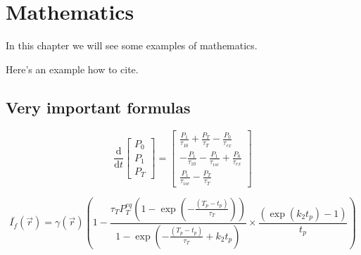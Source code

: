 
\chapter{Mathematics}
\label{ch:math}
In this chapter we will see some examples of mathematics.

Here's an example how to cite.~\cite{belkin_laplacian_2002}

\lipsum[1]

\section{Very important formulas}
\lipsum[2]

\begin{equation}\label{eqn:rate_eqns}
  \frac{\textrm{d}}{\textrm{d}t}\left[
    \begin{array}{l}
      P_{\textit{0}} \\
      P_{\textit{1}} \\
      P_{\textit{T}}
    \end{array}
    \right] =
  \left[
    \begin{array}{l}
      \frac{P_{\textit{1}}}{\tau_{\textit{10}}} + \frac{P_{\textit{T}}}{\tau_{\textit{T}}} - \frac{P_{\textit{0}}}{\tau_{\textit{ex}}} \\
      - \frac{P_{\textit{1}}}{\tau_{\textit{10}}} - \frac{P_{\textit{1}}}{\tau_{isc}} + \frac{P_{\textit{0}}}{\tau_{\textit{ex}}}      \\
      \frac{P_{\textit{1}}}{\tau_{isc}} -  \frac{P_{\textit{T}}}{\tau_{\textit{T}}}
    \end{array}
    \right]
\end{equation}

\lipsum[3]


\begin{equation}\label{eqn:avgfluorescence}
  \bar{I_{f}}(\vec{r})
  = \gamma(\vec{r}) \left(1 - \frac{\tau_{\textit{T}} P_{\textit{T}}^{{eq}}\left(1-\exp \left(-\frac{(T_p - t_p)}{\tau_{\textit{T}}}\right)\right)}{1-\exp\left(-\frac{(T_p - t_p)}{\tau_{\textit{T}}} + k_{\textit{2}} t_p\right)} \times \frac{\left(\exp\left(k_{\textit{2}} t_p\right)-1\right)}{t_p} \right)
\end{equation}

\lipsum[3]